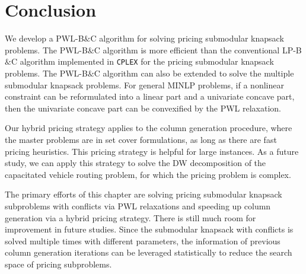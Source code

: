\begin{table}[]
\centering
{}
\caption{Master and pricing problem statistics of different configurations} \label{tab.adapt}
\end{table}





\section{Conclusion}
\label{sec.conc}


 We develop a PWL-B$\&$C algorithm for solving pricing submodular knapsack problems.
The PWL-B$\&$C algorithm is more efficient than the conventional LP-B$\&$C algorithm implemented in \texttt{CPLEX} for the pricing submodular knapsack problems. The PWL-B$\&$C algorithm can also be extended to solve the multiple submodular knapsack problems. For general MINLP problems, if a nonlinear constraint can be reformulated into a linear part and a univariate concave part, then the univariate concave part can be convexified by the PWL relaxation.

Our hybrid pricing strategy applies to the column generation procedure, where the master problems are in set cover formulations, as long as there are fast pricing heuristics. This pricing strategy is helpful for large instances. As a future study, we can apply this strategy to solve the DW decomposition of the capacitated vehicle routing problem, for which the pricing problem is complex.
 
The primary efforts of this chapter are solving pricing submodular knapsack subproblems with conflicts  via PWL relaxations and speeding up column generation via a hybrid pricing strategy. There is still much room for improvement in future studies.  Since the submodular knapsack with conflicts is solved multiple times with different parameters, the information of previous column generation iterations can be leveraged statistically to reduce the search space of pricing subproblems. 


